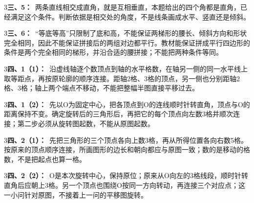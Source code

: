 \documentclass[multi=snippet,border={5bp 20bp 5bp 5bp}]{standalone}
\newenvironment{snippet}[3]{\begin{minipage}{#1bp}\color{answerred}\fontsize{#2}{#3}\selectfont\raggedright}{\end{minipage}}
\begin{document}
\begin{snippet}{505}{11.5}{14}\begin{multicols}{3}\raggedcolumns \textbf{三、5：}\ 两条直线相交成直角，就是互相垂直，本题给出的四个角都是直角，已经满足这个条件。判断依据是相交处的角度，不是线条画成水平、竖直还是倾斜。\end{multicols}\end{snippet}
\begin{snippet}{505}{11.5}{14}\begin{multicols}{3}\raggedcolumns \textbf{三、6：}\ “等底等高”只限制了底和高，不能保证两梯形的腰长、倾斜方向和形状完全相同，因此不能保证拼接后的两组对边都平行。教材能保证拼成平行四边形的条件是两个完全相同的梯形，并沿合适的腰拼接；不能把两种条件等同。\end{multicols}\end{snippet}
\begin{snippet}{505}{11.5}{14}\begin{multicols}{3}\raggedcolumns \textbf{四、1（1）：}\ 沿虚线轴逐个数顶点到轴的水平格数，在轴另一侧的同一水平线上取等距点，再按原轮廓的顺序连接。距轴2格、3格的顶点，另一侧也分别距轴2格、3格；轴上两个端点不移动，不能把整幅半图直接平移过去。\end{multicols}\end{snippet}
\begin{snippet}{505}{11.5}{14}\begin{multicols}{3}\raggedcolumns \textbf{四、1（2）：}\ 先以O为固定中心，把各顶点到O的连线顺时针转直角，顶点与O的距离保持不变。确定旋转后的三角形后，再把它的每个顶点向左数3格并顺次连接；第二步必须从旋转图起数，不能从原图起数。\end{multicols}\end{snippet}
\begin{snippet}{505}{11.5}{14}\begin{multicols}{3}\raggedcolumns \textbf{四、2（1）：}\ 先把三角形的三个顶点各向上数3格，再从所得位置各向右数5格。按原来的顶点顺序连接，所画图形的边长和朝向都应与原图一致；数的是移动的格数，不是把起点也算一格。\end{multicols}\end{snippet}
\begin{snippet}{505}{11.5}{14}\begin{multicols}{3}\raggedcolumns \textbf{四、2（2）：}\ O是本次旋转中心，保持原位；原来从O向左的3格线段，顺时针转直角后应朝上3格。另一个顶点也围绕O按同一方向转动，再连接三个对应点；这一小问针对原图，不接着上一问的平移图旋转。\end{multicols}\end{snippet}
\end{document}

